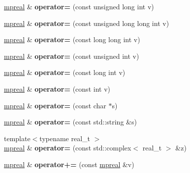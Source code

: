 \begin{DoxyCompactItemize}
\hyperlink{classmpfr_1_1mpreal}{mpreal} \& {\bfseries operator=} (const unsigned long int v)
\item 
\mbox{\label{classmpfr_1_1mpreal_a679d3d5c9b2ef293a3e97978f39cc068}} 
\hyperlink{classmpfr_1_1mpreal}{mpreal} \& {\bfseries operator=} (const unsigned long long int v)
\item 
\mbox{\label{classmpfr_1_1mpreal_a883df4cd5168ab6ea790a7526ed543f0}} 
\hyperlink{classmpfr_1_1mpreal}{mpreal} \& {\bfseries operator=} (const long long int v)
\item 
\mbox{\label{classmpfr_1_1mpreal_a408b56eee989d59ce9c42d6f5d8bd258}} 
\hyperlink{classmpfr_1_1mpreal}{mpreal} \& {\bfseries operator=} (const unsigned int v)
\item 
\mbox{\label{classmpfr_1_1mpreal_a0322e38cd9d47e910ac60525b0e7f47e}} 
\hyperlink{classmpfr_1_1mpreal}{mpreal} \& {\bfseries operator=} (const long int v)
\item 
\mbox{\label{classmpfr_1_1mpreal_a548ca14a66332860c70147372b463119}} 
\hyperlink{classmpfr_1_1mpreal}{mpreal} \& {\bfseries operator=} (const int v)
\item 
\mbox{\label{classmpfr_1_1mpreal_ac029109bfe4878d2625556f4091526dd}} 
\hyperlink{classmpfr_1_1mpreal}{mpreal} \& {\bfseries operator=} (const char $\ast$s)
\item 
\mbox{\label{classmpfr_1_1mpreal_adef6fa867022e1126e21ff78fb5ab8bf}} 
\hyperlink{classmpfr_1_1mpreal}{mpreal} \& {\bfseries operator=} (const std\+::string \&s)
\item 
\mbox{\label{classmpfr_1_1mpreal_a986d7a76d678521182e4822ba7d83fa6}} 
{\footnotesize template$<$typename real\+\_\+t $>$ }\\\hyperlink{classmpfr_1_1mpreal}{mpreal} \& {\bfseries operator=} (const std\+::complex$<$ real\+\_\+t $>$ \&z)
\item 
\mbox{\label{classmpfr_1_1mpreal_ada1edddc3fa9ef7dcbd80594e9b6e34d}} 
\hyperlink{classmpfr_1_1mpreal}{mpreal} \& {\bfseries operator+=} (const \hyperlink{classmpfr_1_1mpreal}{mpreal} \&v)

\end{DoxyCompactItemize}
